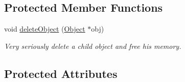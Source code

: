 \subsection*{Protected Member Functions}
\begin{DoxyCompactItemize}
\item 
void \hyperlink{class_scene_ad3897f8ac658af62c133783b2c4eaee4}{delete\-Object} (\hyperlink{class_object}{Object} $\ast$obj)
\begin{DoxyCompactList}\small\item\em Very seriously delete a child object and free his memory. \end{DoxyCompactList}\end{DoxyCompactItemize}
\subsection*{Protected Attributes}
